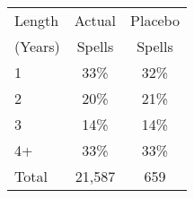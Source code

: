 \begin{tabular}{lcc}
\toprule
Length & Actual & Placebo \\
(Years) & Spells & Spells \\
\midrule
1 & 33\% & 32\% \\
2 & 20\% & 21\% \\
3 & 14\% & 14\% \\
4+ & 33\% & 33\% \\
Total &       21,587 &          659 \\
\bottomrule
\end{tabular}

